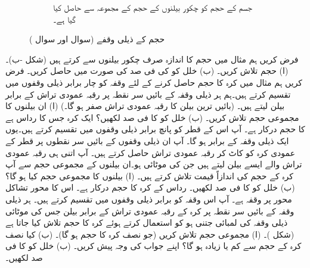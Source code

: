 \begin{figure}
\begin{subfigure}{0.45\textwidth}
\caption{جسم کے حجم کو  چکور بیلنوں کے حجم کے مجموعہ سے حاصل کیا گیا ہے۔}
\end{subfigure}
\caption{حجم کے ذیلی وقفے (سوال  اور سوال )}
\label{شکل_سوال_تکمل_حجم_دو_ٹکڑے}
\end{figure}
فرض کریں ہم مثال  میں حجم کا اندازہ صرف  چکور بیلنوں سے کرتے ہیں (شکل -ب)۔ (ا) حجم  تلاش کریں۔ (ب) خلل  کو  کی فی صد کی صورت میں حاصل کریں۔  
فرض کریں ہم مثال  میں کرہ کا حجم حاصل کرنے کے لئے وقفہ  کو چار برابر ذیلی وقفوں میں تقسیم کرتے ہیں۔ہم ہر ذیلی وقفہ  کے بائیں سر نقطہ پر رقبہ عمودی تراش کے برابر بیلن لیتے ہیں۔ (بائیں ترین بیلن کا رقبہ عمودی تراش صفر ہو گا۔) (ا) ان بیلنوں کا مجموعی حجم  تلاش کریں۔ (ب) خلل  کو  کا فی صد لکھیں؟
ایک کرہ جس کا رداس  ہے کا حجم درکار ہے۔ آپ اس کے قطر کو پانچ برابر ذیلی وقفوں میں تقسیم کرتے ہیں۔یوں ایک ذیلی وقفہ  کے برابر ہو گا۔ آپ ان ذیلی وقفوں  کے بائیں سر نقطوں پر قطر کے عمودی  کرہ کو کاٹ کر رقبہ عمودی تراش حاصل کرتے ہیں۔ آپ اتنی ہی رقبہ عمودی تراش والے ایسے بیلن لیتے ہیں جن کی موٹائی  ہو۔ان بیلنوں کے مجموعی حجم سے آپ کرہ کے حجم کی اندازاً قیمت تلاش کرتے ہیں۔ (ا) بیلنوں کا مجموعی حجم  کیا ہو گا؟ (ب)  خلل  کو  کا فی صد لکھیں۔
رداس  کے کرہ کا حجم درکار ہے۔ اس کا محور تشاکل  محور پر  وقفہ  ہے۔ آپ اس وقفہ کو  برابر ذیلی وقفوں میں تقسیم کرتے ہیں۔ ہر ذیلی وقفہ  کے بائیں سر نقطہ پر کرہ کے رقبہ عمودی تراش کے برابر بیلن جس کی موٹائی ذیلی وقفہ کی لمبائی جتنی ہو کو استعمال کرتے ہوئے کرہ کا حجم تلاش کیا جاتا ہے (شکل )۔ (ا) مجموعی حجم  تلاش کریں (جو نصف کرہ کا حجم ہو گا)۔ (ب) کیا  نصف کرہ کے حجم  سے کم یا زیادہ ہو گا؟ اپنے جواب کی وجہ پیش کریں۔ (ب) خلل  کو  کا فی صد لکھیں۔
